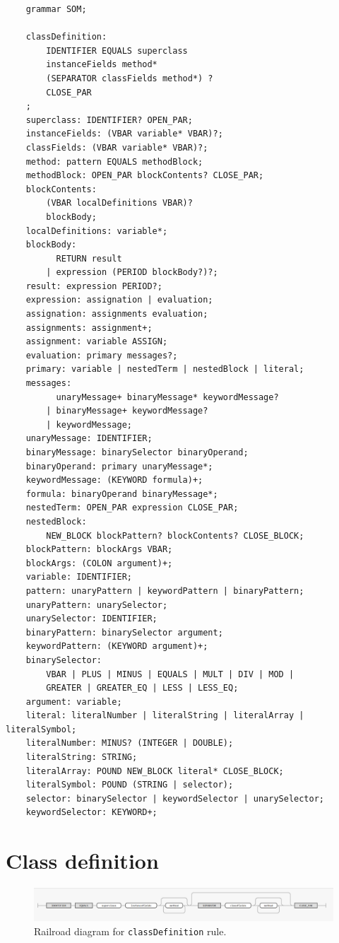 \documentclass[thesis=M,english]{FITthesis}[2019/12/23]
\begin{document}
\begin{verbatim}
	grammar SOM;

	classDefinition:
		IDENTIFIER EQUALS superclass
		instanceFields method*
		(SEPARATOR classFields method*) ?
		CLOSE_PAR
	;
	superclass: IDENTIFIER? OPEN_PAR;
	instanceFields: (VBAR variable* VBAR)?;
	classFields: (VBAR variable* VBAR)?;
	method: pattern EQUALS methodBlock;
	methodBlock: OPEN_PAR blockContents? CLOSE_PAR;
	blockContents:
		(VBAR localDefinitions VBAR)?
		blockBody;
	localDefinitions: variable*;
	blockBody: 
		  RETURN result
		| expression (PERIOD blockBody?)?;
	result: expression PERIOD?;
	expression: assignation | evaluation;
	assignation: assignments evaluation;
	assignments: assignment+;
	assignment: variable ASSIGN;
	evaluation: primary messages?;
	primary: variable | nestedTerm | nestedBlock | literal;
	messages:
		  unaryMessage+ binaryMessage* keywordMessage?
		| binaryMessage+ keywordMessage?
		| keywordMessage;
	unaryMessage: IDENTIFIER;
	binaryMessage: binarySelector binaryOperand;
	binaryOperand: primary unaryMessage*;
	keywordMessage: (KEYWORD formula)+;
	formula: binaryOperand binaryMessage*;
	nestedTerm: OPEN_PAR expression CLOSE_PAR;
	nestedBlock:
		NEW_BLOCK blockPattern? blockContents? CLOSE_BLOCK;
	blockPattern: blockArgs VBAR;
	blockArgs: (COLON argument)+;
	variable: IDENTIFIER;
	pattern: unaryPattern | keywordPattern | binaryPattern;
	unaryPattern: unarySelector;
	unarySelector: IDENTIFIER;
	binaryPattern: binarySelector argument;
	keywordPattern: (KEYWORD argument)+;
	binarySelector: 
		VBAR | PLUS | MINUS | EQUALS | MULT | DIV | MOD |
		GREATER | GREATER_EQ | LESS | LESS_EQ;
	argument: variable;
	literal: literalNumber | literalString | literalArray | literalSymbol;
	literalNumber: MINUS? (INTEGER | DOUBLE);
	literalString: STRING;
	literalArray: POUND NEW_BLOCK literal* CLOSE_BLOCK;
	literalSymbol: POUND (STRING | selector);
	selector: binarySelector | keywordSelector | unarySelector;
	keywordSelector: KEYWORD+;
\end{verbatim}

\section{Class definition}
\begin{figure}[h!]
	\centering
	\includegraphics[width=\textwidth]{media/grammar/classDefinition_rrd.png}
	\caption{Railroad diagram for \texttt{classDefinition} rule.}
	\label{fig:classDefinition_rrd}
\end{figure}
\end{document}
